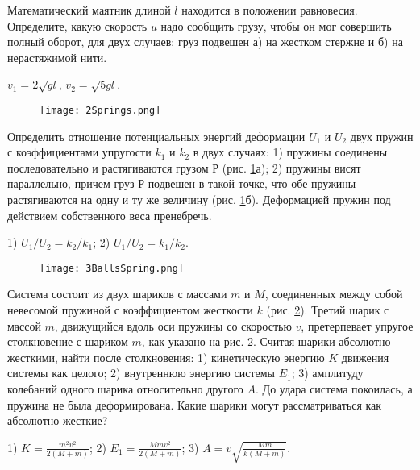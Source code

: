 \begin{ex} %
Математический маятник длиной $l$ находится в положении равновесия. Определите, какую скорость $u$ надо сообщить грузу, чтобы он мог совершить полный оборот, для двух случаев: груз подвешен а) на жестком стержне и б) на нерастяжимой нити.
\begin{ans}
$v_1 = 2\sqrt{gl}$, $v_2 = \sqrt{5gl}$.
\end{ans}
\end{ex}

\begin{figure}
\centering
\texttt{[image: 2Springs.png]}
\caption{}
\label{2Springs}
\end{figure}

\begin{ex} %
Определить отношение потенциальных энергий деформации $U_1$ и $U_2$ двух пружин с коэффициентами упругости $k_1$ и $k_2$ в двух случаях: 1) пружины соединены последовательно и растягиваются грузом $Р$ (рис. \ref{2Springs}а); 2) пружины висят параллельно, причем груз $Р$ подвешен в такой точке, что обе пружины растягиваются на одну и ту же величину (рис. \ref{2Springs}б). Деформацией пружин под действием собственного веса пренебречь.
\begin{ans}
1) $U_1/U_2 = k_2/k_1$; 2) $U_1/U_2 = k_1/k_2$.
\end{ans}
\end{ex}

\begin{figure}
\centering
\texttt{[image: 3BallsSpring.png]}
\caption{}
\label{3BallsSpring}
\end{figure}

\begin{ex} %
Система состоит из двух шариков с массами $m$ и $M$, соединенных между собой невесомой пружиной с коэффициентом жесткости $k$ (рис. \ref{3BallsSpring}). Третий шарик с массой $m$, движущийся вдоль оси пружины со скоростью $v$, претерпевает упругое столкновение с шариком $m$, как указано на рис. \ref{3BallsSpring}. Считая шарики абсолютно жесткими, найти после столкновения: 1) кинетическую энергию $K$ движения системы как целого; 2) внутреннюю энергию системы $E_1$; 3) амплитуду колебаний одного шарика относительно другого $A$. До удара система покоилась, а пружина не была деформирована. Какие шарики могут рассматриваться как абсолютно жесткие?	
\begin{ans}
1) $K=\frac{m^2v^2}{2(M+m)}$; 2) $E_1 = \frac{Mmv^2}{2(M+m)}$; 3) $A = v\sqrt{\frac{Mm}{k(M+m)}}$.
\end{ans}
\end{ex}

